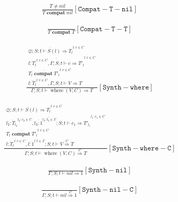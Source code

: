 \documentclass{scrartcl}
\DeclareMathOperator{\where}{where}
\DeclareMathOperator{\compat}{\mathbf{compat}}
\begin{document}
    \begin{align*}
    \frac{
        T \neq nil
    }{
        T \compat nil
    }[\mathtt{Compat-T-nil}]
    \end{align*}
    
    \begin{align*}
    \frac{}{
        T \compat T
    }[\mathtt{Compat-T-T}]
    \end{align*}
    
    \begin{align*}
    \frac{
        \begin{matrix}
        \overline{\oslash; S; t \vdash S(l) \Rightarrow T_l}^{l : c \in C} \\
        \overline{\overline{l : T_l}^{l : c \in C}, \Gamma; S; t \vdash c \Rightarrow T'_l}^{l : c \in C} \\
        \overline{T_l \compat T'_l}^{l : c \in C} \\
        \overline{l : T_l}^{l : c \in C}, \Gamma; S; t \vdash V \Rightarrow T
        \end{matrix}
    }{
        \Gamma; S; t \vdash \where(V, C) \Rightarrow T
    }[\mathtt{Synth-where}]
    \end{align*}
    
    \begin{align*}
    \frac{
        \begin{matrix}
        \overline{\oslash; S; t \vdash S(l) \Rightarrow T_l}^{l : c \in C} \\
        \overline{\overline{l_2 : T_{l_2}}^{l_2 : c_2 \in C}, \overline{l_3 : 1}^{l_3 : t_3 \in \Gamma}; S; t \vdash c_1 \Rightarrow T'_{l_1}}^{l_1: c_1 \in C} \\
        \overline{T_l \compat T'_l}^{l : c \in C} \\
        \overline{l : T_l}^{l: c \in C}, \overline{l : 1}^{l : t \in \Gamma}; S; t \vdash V \overset{C}{\Rightarrow} T
        \end{matrix}
    }{
        \Gamma; S; t \vdash \where(V, C) \overset{C}{\Rightarrow} T
    }[\mathtt{Synth-where-C}]
    \end{align*}
    
    \begin{align*}
    \frac{}{
        \Gamma; S; t \vdash nil \Rightarrow 1
    }[\mathtt{Synth-nil}]
    \end{align*}
    
    \begin{align*}
    \frac{}{
        \Gamma; S; t \vdash nil \overset{C}{\Rightarrow} 1
    }[\mathtt{Synth-nil-C}]
    \end{align*}
    
\end{document}
